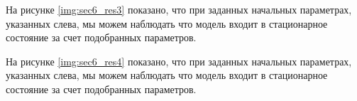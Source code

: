 
На рисунке \ref{img:sec6_res3} показано, что при заданных начальных параметрах, указанных слева, мы можем наблюдать что модель входит в стационарное состояние за счет подобранных параметров.


На рисунке \ref{img:sec6_res4} показано, что при заданных начальных параметрах, указанных слева, мы можем наблюдать что модель входит в стационарное состояние за счет подобранных параметров.


\clearpage